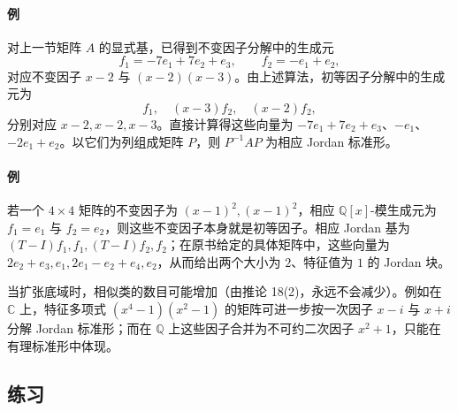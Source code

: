 \paragraph{例}
对上一节矩阵 $A$ 的显式基，已得到不变因子分解中的生成元
\[
f_1=-7e_1+7e_2+e_3,
\qquad f_2=-e_1+e_2,
\]
对应不变因子 $x-2$ 与 $(x-2)(x-3)$。由上述算法，初等因子分解中的生成元为
\[
f_1,\quad (x-3)f_2,\quad (x-2)f_2,
\]
分别对应 $x-2,x-2,x-3$。直接计算得这些向量为 $-7e_1+7e_2+e_3$、$-e_1$、$-2e_1+e_2$。以它们为列组成矩阵 $P$，则 $P^{-1}AP$ 为相应 Jordan 标准形。

\paragraph{例}
若一个 $4\times4$ 矩阵的不变因子为 $(x-1)^2,(x-1)^2$，相应 $\mathbb Q[x]$-模生成元为 $f_1=e_1$ 与 $f_2=e_2$，则这些不变因子本身就是初等因子。相应 Jordan 基为 $(T-I)f_1,f_1,(T-I)f_2,f_2$；在原书给定的具体矩阵中，这些向量为 $2e_2+e_3,e_1,2e_1-e_2+e_4,e_2$，从而给出两个大小为 $2$、特征值为 $1$ 的 Jordan 块。

当扩张底域时，相似类的数目可能增加（由推论 18(2)，永远不会减少）。例如在 $\mathbb C$ 上，特征多项式 $(x^4-1)(x^2-1)$ 的矩阵可进一步按一次因子 $x-i$ 与 $x+i$ 分解 Jordan 标准形；而在 $\mathbb Q$ 上这些因子合并为不可约二次因子 $x^2+1$，只能在有理标准形中体现。
\subsection*{练习}

